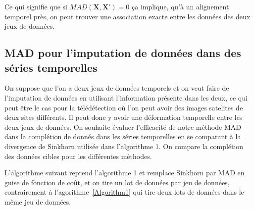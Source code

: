 \documentclass[acmsmall, natbib=false, nonacm]{acmart}
\begin{document}
Ce qui signifie que si $MAD(\textbf{X}, \textbf{X}') = 0$ ça implique, 
qu'à un alignement temporel près, on peut trouver une association exacte entre les données des deux jeux de données.

\subsection{MAD pour l'imputation de données dans des séries temporelles}
On suppose que l'on a deux jeux de données temporels et on veut faire de l'imputation de données en utilisant l'information présente dans les deux, 
ce qui peut être le cas pour la télédétection où l'on peut avoir des images satelites de deux sites différents.
Il peut donc y avoir une déformation temporelle entre les deux jeux de données.
On souhaite évaluer l'efficacité de notre méthode MAD dans la complétion de donnés dans les séries temporelles en se comparant à la divergence de Sinkhorn utilisée dans l'algorithme 1.
On compare la complétion des données cibles pour les différentes méthodes.

L'algorithme suivant reprend l'algorithme 1 et remplace Sinkhorn par MAD en guise de fonction de coût,
et on tire un lot de données par jeu de données, contrairement à l'agorithme~\ref{Algorithm1} qui tire deux lots de données dans le même jeu de données. 
\end{document}
